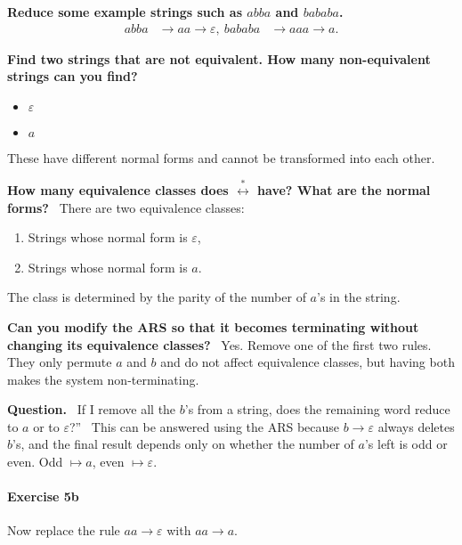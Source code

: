 \documentclass{article}
\theoremstyle{theorem}
\theoremstyle{definition}
\theoremstyle{remark}
\begin{document}
\begin{enumerate}
   \textbf{Reduce some example strings such as $abba$ and $bababa$.}
  \begin{align}
    abba &\to aa \to \varepsilon, \
    bababa &\to aaa \to a.
  \end{align}

   \textbf{Find two strings that are not equivalent. How many non-equivalent strings can you find?}
  \begin{itemize}
    \item $\varepsilon$
    \item $a$
  \end{itemize}
  These have different normal forms and cannot be transformed into each other.

   \textbf{How many equivalence classes does $\stackrel{\ast}{\longleftrightarrow}$ have? What are the normal forms?} \
  There are two equivalence classes:
  \begin{enumerate}
    \item Strings whose normal form is $\varepsilon$,
    \item Strings whose normal form is $a$.
  \end{enumerate}
  The class is determined by the parity of the number of $a$’s in the string.

   \textbf{Can you modify the ARS so that it becomes terminating without changing its equivalence classes?} \
  Yes. Remove one of the first two rules. They only permute $a$ and $b$ and do not affect equivalence classes, but having both makes the system non-terminating.

   \textbf{Question.} \
If I remove all the $b$’s from a string, does the remaining word reduce to $a$ or to $\varepsilon$?”  
\ans\ This can be answered using the ARS because $b \to \varepsilon$ always deletes $b$’s, and the final result depends only on whether the number of $a$’s left is odd or even. Odd $\mapsto a$, even $\mapsto \varepsilon$.

\end{enumerate}
\paragraph{Exercise 5b}

Now replace the rule $aa \to \varepsilon$ with $aa \to a$.
\end{document}
